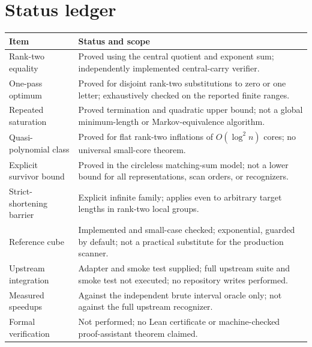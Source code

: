 \documentclass[11pt]{article}
\theoremstyle{definition}
\theoremstyle{remark}
\begin{document}
\section{Status ledger}
\begin{longtable}{p{.27\linewidth}p{.64\linewidth}}
\toprule
Item & Status and scope\\
\midrule
\endhead
Rank-two equality & Proved using the central quotient and exponent sum;
independently implemented central-carry verifier.\\[4pt]
One-pass optimum & Proved for disjoint rank-two substitutions to zero or one
letter; exhaustively checked on the reported finite ranges.\\[4pt]
Repeated saturation & Proved termination and quadratic upper bound; not a
global minimum-length or Markov-equivalence algorithm.\\[4pt]
Quasi-polynomial class & Proved for flat rank-two inflations of
$O(\log^2 n)$ cores; no universal small-core theorem.\\[4pt]
Explicit survivor bound & Proved in the circleless matching-sum model; not
a lower bound for all representations, scan orders, or recognizers.\\[4pt]
Strict-shortening barrier & Explicit infinite family; applies even to
arbitrary target lengths in rank-two local groups.\\[4pt]
Reference cube & Implemented and small-case checked; exponential, guarded
by default; not a practical substitute for the production scanner.\\[4pt]
Upstream integration & Adapter and smoke test supplied; full upstream suite
and smoke test not executed; no repository writes performed.\\[4pt]
Measured speedups & Against the independent brute interval oracle only;
not against the full upstream recognizer.\\[4pt]
Formal verification & Not performed; no Lean certificate or machine-checked
proof-assistant theorem claimed.\\
\bottomrule
\end{longtable}
\end{document}
